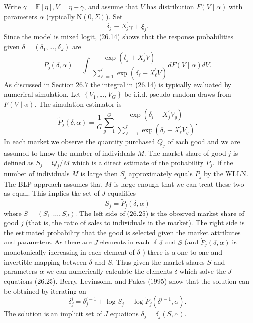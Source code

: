 \documentclass[10pt]{article}
\begin{document}
Write $\gamma=\mathbb{E}[\eta], V=\eta-\gamma$, and assume that $V$ has distribution $F(V \mid \alpha)$ with parameters $\alpha$ (typically $\mathrm{N}(0, \Sigma))$. Set
$$
\delta_{j}=X_{j}^{\prime} \gamma+\xi_{j} .
$$
Since the model is mixed logit, (26.14) shows that the response probabilities given $\delta=\left(\delta_{1}, \ldots, \delta_{J}\right)$ are
$$
P_{j}(\delta, \alpha)=\int \frac{\exp \left(\delta_{j}+X_{j}^{\prime} V\right)}{\sum_{\ell=1}^{J} \exp \left(\delta_{\ell}+X_{\ell}^{\prime} V\right)} d F(V \mid \alpha) d V .
$$
As discussed in Section $26.7$ the integral in (26.14) is typically evaluated by numerical simulation. Let $\left\{V_{1}, \ldots, V_{G}\right\}$ be i.i.d. pseudo-random draws from $F(V \mid \alpha)$. The simulation estimator is
$$
\widetilde{P}_{j}(\delta, \alpha)=\frac{1}{G} \sum_{g=1}^{G} \frac{\exp \left(\delta_{j}+X_{j}^{\prime} V_{g}\right)}{\sum_{\ell=1}^{J} \exp \left(\delta_{\ell}+X_{\ell}^{\prime} V_{g}\right)} .
$$
In each market we observe the quantity purchased $Q_{j}$ of each good and we are assumed to know the number of individuals $M$. The market share of good $j$ is defined as $S_{j}=Q_{j} / M$ which is a direct estimate of the probability $P_{j}$. If the number of individuals $M$ is large then $S_{j}$ approximately equals $P_{j}$ by the WLLN. The BLP approach assumes that $M$ is large enough that we can treat these two as equal. This implies the set of $J$ equalities
$$
S_{j}=\widetilde{P}_{j}(\delta, \alpha)
$$
where $S=\left(S_{1}, \ldots, S_{J}\right)$. The left side of (26.25) is the observed market share of good $j$ (that is, the ratio of sales to individuals in the market). The right side is the estimated probability that the good is selected given the market attributes and parameters. As there are $J$ elements in each of $\delta$ and $S$ (and $\widetilde{P}_{j}(\delta, \alpha)$ is monotonically increasing in each element of $\delta$ ) there is a one-to-one and invertible mapping between $\delta$ and $S$. Thus given the market shares $S$ and parameters $\alpha$ we can numerically calculate the elements $\delta$ which solve the $J$ equations (26.25). Berry, Levinsohn, and Pakes (1995) show that the solution can be obtained by iterating on
$$
\delta_{j}^{i}=\delta_{j}^{i-1}+\log S_{j}-\log \widetilde{P}_{j}\left(\delta^{i-1}, \alpha\right) .
$$
The solution is an implicit set of $J$ equations $\delta_{j}=\delta_{j}(S, \alpha)$.
\end{document}
